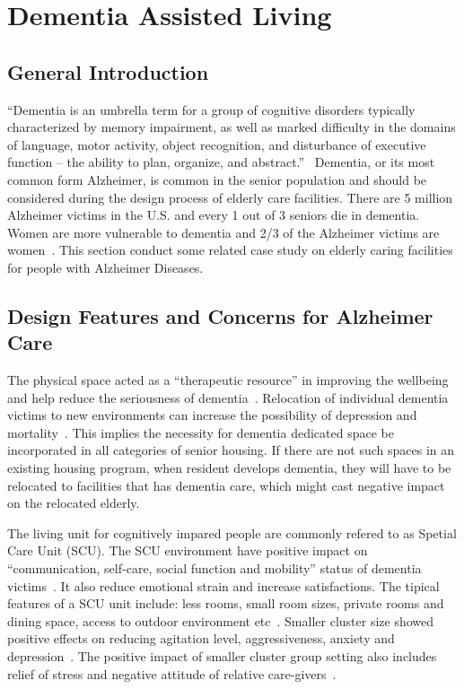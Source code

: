 \section{Dementia Assisted Living}
\subsection{General Introduction}
``Dementia is an umbrella term for a group of cognitive disorders
typically characterized by memory impairment, as well as marked
difficulty in the domains of language, motor activity, object
recognition, and disturbance of executive function – the ability to
plan, organize, and abstract.''~\cite{CDCdementia} Dementia, or its
most common form Alzheimer, is common in the senior population and
should be considered during the design process of elderly care
facilities. There are 5 million Alzheimer victims in the U.S. and
every 1 out of 3 seniors die in dementia. Women are more vulnerable to
dementia and 2/3 of the Alzheimer victims are
women~\cite{alzorg2014}. This section conduct some related case study
on elderly caring facilities for people with Alzheimer Diseases.

\subsection{Design Features and Concerns for Alzheimer Care}
The physical space acted as a ``therapeutic resource'' in improving
the wellbeing and help reduce the seriousness of
dementia~\cite{Day2000}. Relocation of individual dementia victims to
new environments can increase the possibility of depression and
mortality~\cite{ANTHONY01111987}. This implies the necessity for
dementia dedicated space be incorporated in all categories of senior
housing. If there are not such spaces in an existing housing program,
when resident develops dementia, they will have to be relocated to
facilities that has dementia care, which might cast negative impact on
the relocated elderly. 

The living unit for cognitively impared people are commonly refered to
as Spetial Care Unit (SCU). The SCU environment have positive impact
on ``communication, self-care, social function and mobility'' status
of dementia victims~\cite{Day2000}. It also reduce emotional strain
and increase satisfactions. The tipical features of a SCU unit
include: less rooms, small room sizes, private rooms and dining space,
access to outdoor environment etc~\cite{Day2000}. Smaller cluster size
showed positive effects on reducing agitation level, aggressiveness,
anxiety and depression~\cite{Day2000}. The positive impact of smaller
cluster group setting also includes relief of stress and negative
attitude of relative care-givers~\cite{Annerstedt19931529, Day2000}.

